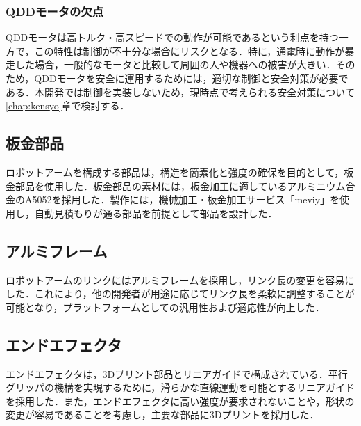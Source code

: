 \subsubsection{QDDモータの欠点}
QDDモータは高トルク・高スピードでの動作が可能であるという利点を持つ一方で，この特性は制御が不十分な場合にリスクとなる．特に，通電時に動作が暴走した場合，一般的なモータと比較して周囲の人や機器への被害が大きい．そのため，QDDモータを安全に運用するためには，適切な制御と安全対策が必要である．本開発では制御を実装しないため，現時点で考えられる安全対策について\ref{chap:kensyo}章で検討する．
\clearpage

\subsection{板金部品}
ロボットアームを構成する部品は，構造を簡素化と強度の確保を目的として，板金部品を使用した．板金部品の素材には，板金加工に適しているアルミニウム合金のA5052を採用した．製作には，機械加工・板金加工サービス「meviy」\cite{meviy:online}を使用し，自動見積もりが通る部品を前提として部品を設計した．
\subsection{アルミフレーム}
ロボットアームのリンクにはアルミフレームを採用し，リンク長の変更を容易にした．これにより，他の開発者が用途に応じてリンク長を柔軟に調整することが可能となり，プラットフォームとしての汎用性および適応性が向上した．
\subsection{エンドエフェクタ}
エンドエフェクタは，3Dプリント部品とリニアガイドで構成されている．平行グリッパの機構を実現するために，滑らかな直線運動を可能とするリニアガイドを採用した．また，エンドエフェクタに高い強度が要求されないことや，形状の変更が容易であることを考慮し，主要な部品に3Dプリントを採用した．

\newpage